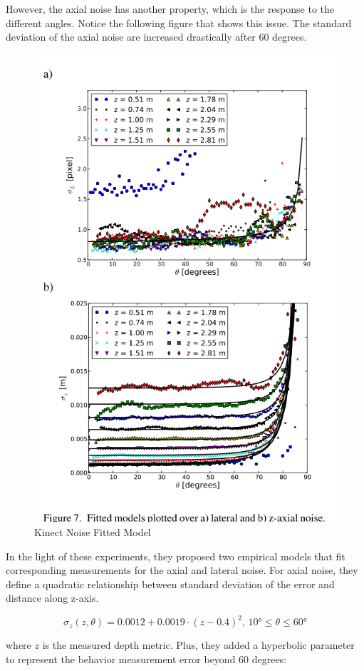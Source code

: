 \documentclass[a4paper]{report}
\numberwithin{figure}{section}
\begin{document}
However, the axial noise has another property, which is the response to the 
different angles. Notice the following figure that shows this issue. The
standard deviation of the axial noise are increased drastically after 
60 degrees. 


\begin{figure}[H]
	\centering
  \includegraphics[width=0.7\linewidth,natwidth=640,natheight=640]
  {fig/ref_imgs/kinect_noise_fitted_model.png}
  \caption{Kinect Noise Fitted Model}
	\label{fig:kinect_noise_fitted_model}
\end{figure}

In the light of these experiments, they proposed two empirical 
models that fit corresponding measurements for the axial and lateral noise.
For axial noise, they define a 
quadratic relationship between standard deviation of the error and distance 
along z-axis. 

\begin{equation}
  \sigma_z (z,\theta) = 0.0012 + 0.0019 \cdot (z-0.4)^2 \text{, }
  \ang{10}\leq \theta \leq \ang{60}
\end{equation}

where $z$ is the measured depth metric. 
Plus, they added a hyperbolic parameter to represent the 
behavior measurement error beyond 60 degrees:
\end{document}
